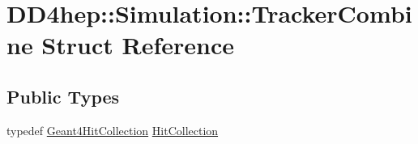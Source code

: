\hypertarget{struct_d_d4hep_1_1_simulation_1_1_tracker_combine}{}\section{D\+D4hep\+:\+:Simulation\+:\+:Tracker\+Combine Struct Reference}
\label{struct_d_d4hep_1_1_simulation_1_1_tracker_combine}
\subsection*{Public Types}
\begin{DoxyCompactItemize}
\item 
typedef \hyperlink{class_d_d4hep_1_1_simulation_1_1_geant4_hit_collection}{Geant4\+Hit\+Collection} \hyperlink{struct_d_d4hep_1_1_simulation_1_1_tracker_combine_ae776b8d22a42d425b4d9b6344ed430e1}{Hit\+Collection}
\end{DoxyCompactItemize}
